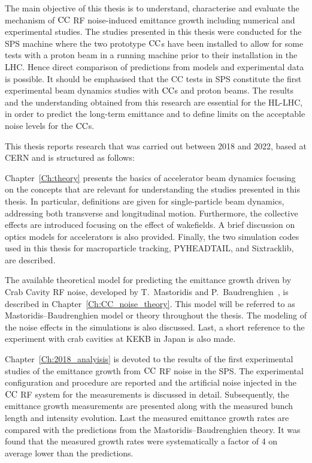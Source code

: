 The main objective of this thesis is to understand, characterise and evaluate the mechanism of ${\mathrm{CC}}$ RF noise-induced emittance growth including numerical and experimental studies. The studies presented in this thesis were conducted for the SPS machine where the two prototype ${\mathrm{CC}}$s have been installed to allow for some tests with a proton beam in a running machine prior to their installation in the LHC. Hence direct comparison of predictions from models and experimental data is possible. 
It should be emphasised that the CC tests in SPS constitute the first experimental beam dynamics studies with ${\mathrm{CC}}$s and proton beams. The results and the understanding obtained from this research are essential for the HL-LHC, in order to predict the long-term emittance and to define limits on the acceptable noise levels for the ${\mathrm{CC}}$s.

This thesis reports research that was carried out between 2018 and 2022, based at CERN and is structured as follows:

Chapter~\ref{Ch:theory} presents the basics of accelerator beam dynamics focusing on the concepts that are relevant for understanding the studies presented in this thesis. In particular, definitions are given for single-particle beam dynamics, addressing both transverse and longitudinal motion. Furthermore, the collective effects are introduced focusing on the effect of wakefields. A brief discussion on optics models for accelerators is also provided. Finally, the two simulation codes used in this thesis for macroparticle tracking, PYHEADTAIL, and Sixtracklib, are described.

The available theoretical model for predicting the emittance growth driven by Crab Cavity RF noise, developed by T.~Mastoridis and P.~Baudrenghien~\cite{PhysRevSTAB.18.101001}, is described in Chapter~\ref{Ch:CC_noise_theory}. This model will be referred to as Mastoridis--Baudrenghien model or theory throughout the thesis. The modeling of the noise effects in the simulations is also discussed. Last, a short reference to the experiment with crab cavities at KEKB in Japan is also made. 

Chapter~\ref{Ch:2018_analyisis} is devoted to the results of the first experimental studies of the emittance growth from ${\mathrm{CC}}$ RF noise in the SPS. The experimental configuration and procedure are reported and the artificial noise injected in the ${\mathrm{CC}}$ RF system for the measurements is discussed in detail. Subsequently, the emittance growth measurements are presented along with the measured bunch length and intensity evolution. Last the measured emittance growth rates are compared with the predictions from the Mastoridis--Baudrenghien theory. It was found that the measured growth rates were systematically a factor of 4 on average lower than the predictions. 

